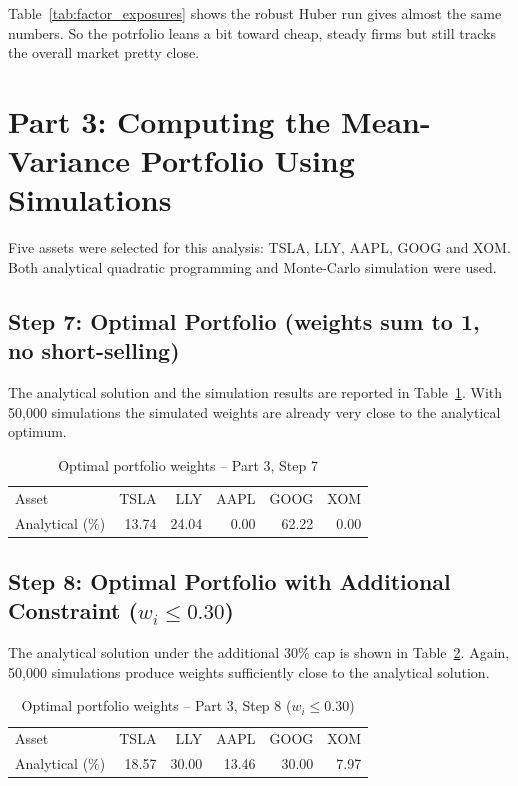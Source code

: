 \documentclass[11pt,a4paper]{article}
\begin{document}
Table~\ref{tab:factor_exposures} shows the robust Huber run gives almost the same numbers. So the potrfolio leans a bit toward cheap, steady firms but still tracks the overall market pretty close.


\section{Part 3: Computing the Mean-Variance Portfolio Using Simulations}

Five assets were selected for this analysis: TSLA, LLY, AAPL, GOOG and XOM. Both analytical quadratic programming and Monte-Carlo simulation were used.

\subsection{Step 7: Optimal Portfolio (weights sum to 1, no short-selling)}
The analytical solution and the simulation results are reported in Table~\ref{tab:step7}. With 50,000 simulations the simulated weights are already very close to the analytical optimum.

\begin{table}[H]
\centering
\caption{Optimal portfolio weights -- Part 3, Step 7}
\begin{tabular}{lrrrrr}
\toprule
Asset & TSLA & LLY & AAPL & GOOG & XOM \\
Analytical (\%) & 13.74 & 24.04 & 0.00 & 62.22 & 0.00 \\
\bottomrule
\end{tabular}
\label{tab:step7}
\end{table}

\subsection{Step 8: Optimal Portfolio with Additional Constraint ($w_i \leq 0.30$)}
The analytical solution under the additional 30\% cap is shown in Table~\ref{tab:step8}. Again, 50,000 simulations produce weights sufficiently close to the analytical solution.

\begin{table}[H]
\centering
\caption{Optimal portfolio weights -- Part 3, Step 8 ($w_i \leq 0.30$)}
\begin{tabular}{lrrrrr}
\toprule
Asset & TSLA & LLY & AAPL & GOOG & XOM \\
Analytical (\%) & 18.57 & 30.00 & 13.46 & 30.00 & 7.97 \\
\bottomrule
\end{tabular}
\label{tab:step8}
\end{table}
\end{document}
